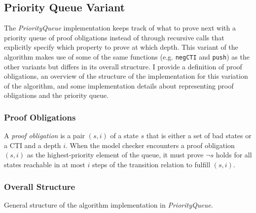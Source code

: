 \documentclass[12pt,a4paper,twoside,openright]{report}
\begin{document}
{\subsection{Priority Queue Variant}
\label{pqueue}

The \emph{PriorityQueue} implementation keeps track of what to prove next with a priority
queue of proof obligations instead of through recursive calls that explicitly specify which
property to prove at which depth. This variant of the algorithm makes
use of some of the same functions (e.g. \verb,negCTI, and \verb,push,) as the other variants but
differs in its overall structure.
I provide a definition of proof obligations, an
overview of the structure of the implementation for this variation of the algorithm,
and some implementation details about representing proof obligations and the priority queue.

\subsubsection{Proof Obligations}
A \emph{proof obligation} is a pair $(s,i)$ of a state $s$ that is either a set of bad states
or a CTI and a depth $i$. When the model checker encounters a proof obligation
$(s,i)$ as the highest-priority element of the queue, it must prove $\neg s$ holds for all states
reachable in at most $i$ steps of the transition relation to fulfill
$(s, i)$.

\subsubsection{Overall Structure}
\begin{algorithm}[!Ht]
\DontPrintSemicolon
{}
\Fn{fulfillObligations$(M,[F_0,\ldots,F_k],{\it queue}])$}{
  \Let{$((s,i), {\it q}) = {\it dequeue(queue)}$ \label{dequeue}}{
  \lIf{$F_{i - 1} \wedge T \Rightarrow \neg s'$}{\Return{${\it pushFrame(M, [F_0, \dots, F_k], q, (s,i))}$}}
  }
  \lElse{\Let{${\it cti = nextCTI(F_{i - 1} \wedge T \Rightarrow \neg s')}$}{
      \If{$I \Rightarrow \neg {\it cti}$}{
        \Let{${\it (fixed, [G_0, \ldots, G_k], d) = propagate([F_0 \cup \{\neg cti\}, F_1, \ldots, F_k], {\it \neg cti})}$}{
          \lIf{\it fixed}{\Return{True}}
          \Return{${\it fulfillObligation(M, [G_0 , \ldots, G_k], (generalize(\neg cti, d),d))}$}
        }
      }
      \lElse{\Return{False}}}}
}
\caption{General structure of the algorithm implementation in {\it PriorityQueue}.}
\label{pqueuestr}
\end{algorithm}

}
\end{document}

